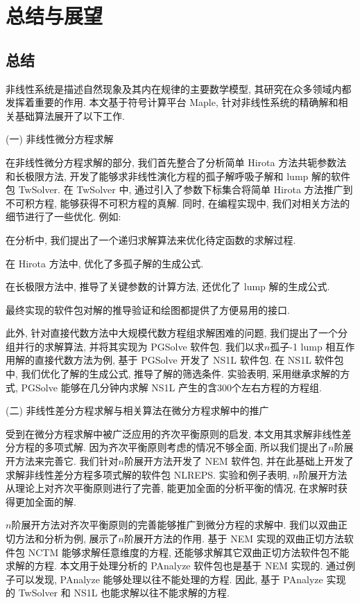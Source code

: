 \chapter{总结与展望}\label{ch07}
\section{总结}
非线性系统是描述自然现象及其内在规律的主要数学模型, 其研究在众多领域内都发挥着重要的作用. 本文基于符号计算平台 Maple, 针对非线性系统的精确解和相关基础算法展开了以下工作.

(一) 非线性微分方程求解

在非线性微分方程求解的部分, 我们首先整合了\Painleve{}分析\D 简单 Hirota 方法\D 共轭参数法和长极限方法, 开发了能够求非线性演化方程的孤子解\D 呼吸子解和 lump 解的软件包 TwSolver. 在 TwSolver 中, 通过引入了参数下标集合将简单 Hirota 方法推广到不可积方程, 能够获得不可积方程的真解. 同时, 在编程实现中, 我们对相关方法的细节进行了一些优化. 例如:
\begin{compactenum}[(1)]
\item 在\Painleve{}分析中, 我们提出了一个递归求解算法来优化待定函数的求解过程.
\item 在 Hirota 方法中, 优化了多孤子解的生成公式.
\item 在长极限方法中, 推导了关键参数的计算方法, 还优化了 lump 解的生成公式.
\item 最终实现的软件包对解的推导\D 验证和绘图都提供了方便易用的接口. 
\end{compactenum}

此外, 针对直接代数方法中大规模代数方程组求解困难的问题, 我们提出了一个分组并行的求解算法, 并将其实现为 PGSolve 软件包. 我们以求$n$孤子-1 lump 相互作用解的直接代数方法为例, 基于 PGSolve 开发了 NS1L 软件包. 在 NS1L 软件包中, 我们优化了解的生成公式, 推导了解的筛选条件. 实验表明, 采用继承求解的方式, PGSolve 能够在几分钟内求解 NS1L 产生的含300个左右方程的方程组. 

(二) 非线性差分方程求解与相关算法在微分方程求解中的推广

受到在微分方程求解中被广泛应用的齐次平衡原则的启发, 本文用其求解非线性差分方程的多项式解. 因为齐次平衡原则考虑的情况不够全面, 所以我们提出了$n$阶展开方法来完善它. 我们针对$n$阶展开方法开发了 NEM 软件包, 并在此基础上开发了求解非线性差分方程多项式解的软件包 NLREPS. 实验和例子表明, $n$阶展开方法从理论上对齐次平衡原则进行了完善, 能更加全面的分析平衡的情况, 在求解时获得更加全面的解. 

$n$阶展开方法对齐次平衡原则的完善能够推广到微分方程的求解中. 我们以双曲正切方法和\Painleve{}分析为例, 展示了$n$阶展开方法的作用. 基于 NEM 实现的双曲正切方法软件包 NCTM 能够求解任意维度的方程, 还能够求解其它双曲正切方法软件包不能求解的方程. 本文用于处理\Painleve{}分析的 PAnalyze 软件包也是基于 NEM 实现的. 通过例子可以发现, PAnalyze 能够处理以往不能处理的方程. 因此, 基于 PAnalyze 实现的 TwSolver 和 NS1L 也能求解以往不能求解的方程.

